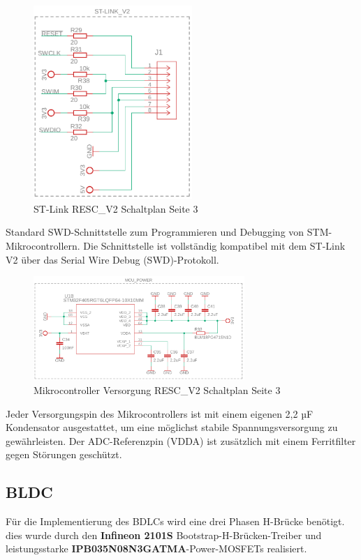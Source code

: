 \documentclass[paper=a4,11pt]{scrreprt}
\begin{document}
\begin{figure}[ht]
\begin{center}
\includegraphics[width=6cm]{Bilder/ST-Link.PNG}
\caption{ST-Link RESC\_V2 Schaltplan Seite 3}
\label{ST_LINK}
\end{center}
\end{figure}

Standard SWD-Schnittstelle zum Programmieren und Debugging von STM-Mikrocontrollern. Die Schnittstelle ist vollständig kompatibel mit dem ST-Link V2 über das Serial Wire Debug (SWD)-Protokoll.


\begin{figure}[ht]
\begin{center}
\includegraphics[width=8cm]{Bilder/MCU-Power.PNG}
\caption{Mikrocontroller Versorgung RESC\_V2 Schaltplan Seite 3}
\label{mcu_psu}
\end{center}
\end{figure}

Jeder Versorgungspin des Mikrocontrollers ist mit einem eigenen 2,2 µF Kondensator ausgestattet, um eine möglichst stabile Spannungsversorgung zu gewährleisten. Der ADC-Referenzpin (VDDA) ist zusätzlich mit einem Ferritfilter gegen Störungen geschützt.
\newpage
\subsection{BLDC}
Für die Implementierung des BDLCs wird eine drei Phasen H-Brücke benötigt. dies wurde durch den \textbf{Infineon 2101S} Bootstrap-H-Brücken-Treiber und leistungsstarke \textbf{IPB035N08N3GATMA}-Power-MOSFETs realisiert.
\end{document}
